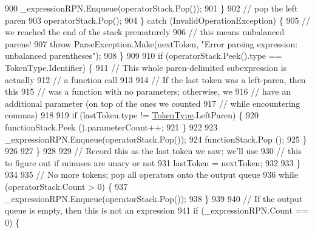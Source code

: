 \begin{DoxyCode}
900                                 \_expressionRPN.Enqueue(operatorStack.Pop());
901                             \}
902                             \textcolor{comment}{// pop the left paren}
903                             operatorStack.Pop();
904                         \} \textcolor{keywordflow}{catch} (InvalidOperationException) \{
905                             \textcolor{comment}{// we reached the end of the stack prematurely}
906                             \textcolor{comment}{// this means unbalanced parens!}
907                             \textcolor{keywordflow}{throw} ParseException.Make(nextToken, \textcolor{stringliteral}{"Error parsing expression: unbalanced
       parentheses"});
908                         \}
909 
910                         \textcolor{keywordflow}{if} (operatorStack.Peek().type == TokenType.Identifier) \{
911                             \textcolor{comment}{// This whole paren-delimited subexpression is actually}
912                             \textcolor{comment}{// a function call}
913 
914                             \textcolor{comment}{// If the last token was a left-paren, then this}
915                             \textcolor{comment}{// was a function with no parameters; otherwise, we }
916                             \textcolor{comment}{// have an additional parameter (on top of the ones we counted}
917                             \textcolor{comment}{// while encountering commas)}
918 
919                             \textcolor{keywordflow}{if} (lastToken.type != \hyperlink{a00040_a301aa7c866593a5b625a8fc158bbeace}{TokenType}.LeftParen) \{
920                                 functionStack.Peek ().parameterCount++;
921                             \}
922 
923                             \_expressionRPN.Enqueue(operatorStack.Pop());
924                             functionStack.Pop ();
925                         \}
926 
927                     \}
928 
929                     \textcolor{comment}{// Record this as the last token we saw; we'll use}
930                     \textcolor{comment}{// this to figure out if minuses are unary or not}
931                     lastToken = nextToken;
932 
933                 \}
934 
935                 \textcolor{comment}{// No more tokens; pop all operators onto the output queue}
936                 \textcolor{keywordflow}{while} (operatorStack.Count > 0) \{
937                     \_expressionRPN.Enqueue(operatorStack.Pop());
938                 \}
939 
940                 \textcolor{comment}{// If the output queue is empty, then this is not an expression}
941                 \textcolor{keywordflow}{if} (\_expressionRPN.Count == 0) \{

\end{DoxyCode}
